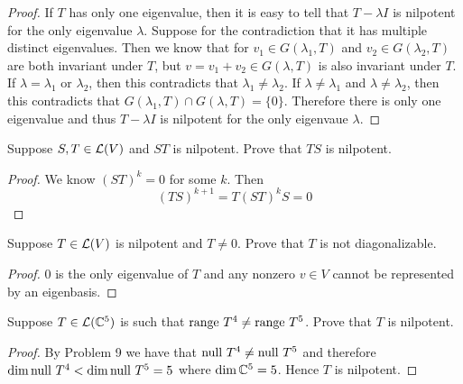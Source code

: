 \documentclass{extarticle}
\begin{document}
\begin{proof}
If \(T\) has only one eigenvalue, then it is easy to tell that \(T - \lambda I\) is nilpotent 
for the only eigenvalue \(\lambda\). Suppose for the contradiction that it has multiple 
distinct eigenvalues. Then we know that for \(v_1 \in G(\lambda_1, T)\) and \(v_2 \in G(\lambda_2, T)\)
are both invariant under \(T\), but \(v = v_1 + v_2 \in G(\lambda, T)\) is also invariant under 
\(T\). If \(\lambda = \lambda_1\) or 
\(\lambda_2\), then this contradicts that \(\lambda_1 \neq \lambda_2\). If \(\lambda \neq \lambda_1\)
and \(\lambda \neq \lambda_2\), then this contradicts that \(G(\lambda_1, T) \cap G(\lambda, T) = \{0\}\).
Therefore there is only one eigenvalue and thus \(T - \lambda I\) is nilpotent for the only 
eigenvaue \(\lambda\). 

\end{proof}


\begin{problem}{13}
    Suppose \(S, T \in \mathcal{L}(V)\) and \(ST\) is nilpotent. Prove that \(TS\) is nilpotent. 
\end{problem}

\begin{proof}
We know \((ST)^k = 0\) for some \(k\). Then 
\[(TS)^{k+1} = T(ST)^kS = 0\]
\end{proof}

\begin{problem}{14}
    Suppose \(T \in \mathcal{L}(V)\) is nilpotent and \(T \neq 0\). Prove that \(T\) is not 
    diagonalizable.
\end{problem}

\begin{proof}
\(0\) is the only eigenvalue of \(T\) and any nonzero \(v \in V\) cannot be represented by an eigenbasis.
\end{proof}



\begin{problem}{22}
    Suppose \(T \in \mathcal{L}(\mathbb{C}^5)\) is such that \(\text{range } T^4 \neq \text{range } T^5\). Prove that 
    \(T\) is nilpotent. 
\end{problem}

\begin{proof}
By Problem 9 we have that \(\text{null } T^4 \neq \text{null } T^5 \) and therefore \(\dim \text{null } T^4 < 
\dim \text{null } T^5 = 5\) where \(\dim \mathbb{C}^5 =5 \). Hence \(T\) is nilpotent. 
\end{proof}



\end{document}
